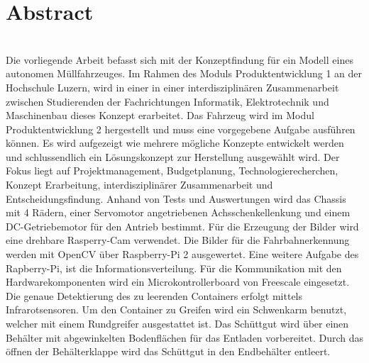 \section{Abstract}\\[0.2cm]
Die vorliegende Arbeit befasst sich mit der Konzeptfindung für ein Modell eines autonomen Müllfahrzeuges. Im Rahmen des Moduls Produktentwicklung 1 an der Hochschule Luzern, wird in einer in einer interdisziplinären Zusammenarbeit zwischen Studierenden der Fachrichtungen Informatik, Elektrotechnik und Maschinenbau dieses Konzept erarbeitet. Das Fahrzeug wird im Modul Produktentwicklung 2 hergestellt und muss eine vorgegebene Aufgabe ausführen können. Es wird aufgezeigt wie mehrere mögliche Konzepte entwickelt werden und schlussendlich ein Lösungskonzept zur Herstellung ausgewählt wird. Der Fokus liegt auf Projektmanagement, Budgetplanung, Technologierecherchen, Konzept Erarbeitung, interdisziplinärer Zusammenarbeit und Entscheidungsfindung. Anhand von Tests und Auswertungen wird das Chassis mit 4 Rädern, einer Servomotor angetriebenen Achsschenkellenkung und einem DC-Getriebemotor für den Antrieb bestimmt. Für die Erzeugung der Bilder wird eine drehbare Rasperry-Cam verwendet. Die Bilder für die Fahrbahnerkennung werden mit OpenCV über Raspberry-Pi 2 ausgewertet. Eine weitere Aufgabe des Rapberry-Pi, ist die Informationsverteilung. Für die Kommunikation mit den Hardwarekomponenten wird ein Microkontrollerboard von Freescale eingesetzt. Die genaue Detektierung des zu leerenden Containers erfolgt mittels Infrarotsensoren. Um den Container zu Greifen wird ein Schwenkarm benutzt, welcher mit einem Rundgreifer ausgestattet ist. Das Schüttgut wird über einen Behälter mit abgewinkelten Bodenflächen für das Entladen vorbereitet. Durch das öffnen der Behälterklappe wird das Schüttgut in den Endbehälter entleert.
\clearpage